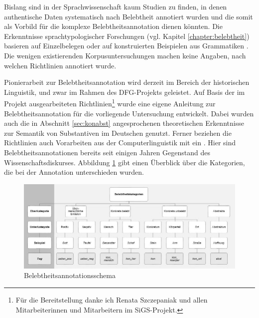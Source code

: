 
Bislang sind in der Sprachwissenschaft kaum Studien zu finden, in denen authentische Daten systematisch nach Belebtheit annotiert wurden und die somit als Vorbild für die komplexe  Belebtheitsannotation dienen könnten. Die Erkenntnisse sprachtypologischer Forschungen (vgl. Kapitel \ref{chapter:belebtheit}) basieren auf Einzelbelegen oder auf konstruierten Beispielen aus Grammatiken \parencite{Comrie1989,Corbett2000,Aissen2003}. Die wenigen existierenden Korpusuntersuchungen  \parencite{Dahl1996,Yamamoto1999} machen keine Angaben, nach welchen Richtlinien annotiert wurde.

Pionierarbeit zur Belebtheitsannotation wird derzeit im Bereich der historischen Linguistik, und zwar im Rahmen des DFG-Projekts  \parencite[vgl.][]{Szczepaniak2016} geleistet. Auf Basis der im Projekt ausgearbeiteten Richtlinien\footnote{Für die Bereitstellung danke ich Renata Szczepaniak und allen Mitarbeiterinnen und Mitarbeitern im SiGS-Projekt.} wurde eine eigene Anleitung zur Belebtheitsannotation für die vorliegende Untersuchung entwickelt. Dabei wurden auch die in Abschnitt \ref{sec:konabst} angesprochenen theoretischen Erkenntnisse zur Semantik von Substantiven im Deutschen \parencite[u.a.][]{Ewald1992,Studler2011} genutzt. Ferner beziehen die Richtlinien auch Vorarbeiten aus der Computerlinguistik mit ein \parencite[vgl.][]{Garretson2004,Zaenen2004,Ovrelid2009}. Hier sind Belebtheitsannotationen bereits seit einigen Jahren Gegenstand des Wissenschaftsdiskurses. Abbildung \ref{abb:belebtheitsannotationsschema} gibt einen Überblick über die Kategorien, die bei der Annotation unterschieden wurden.

\begin{figure}[h]
\begin{center}
  \includegraphics[width=12 cm]{images/annotationsschema-belebtheit-sw.jpg}
\caption {Belebtheitsannotationsschema}
\label{abb:belebtheitsannotationsschema}
\end{center}
\end{figure} 

